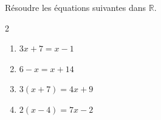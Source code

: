 \begin{exo}{}
	Résoudre les équations suivantes dans $\mathbb{R}$.

	\vspace*{-2mm}
	\begin{multicols}{2}
		\begin{enumerate}
			\item $3x + 7 = x - 1$
			\item $6 - x = x + 14$
			\item $3(x + 7) = 4x + 9$
			\item $2(x - 4) = 7x - 2$
		\end{enumerate}
	\end{multicols}
\end{exo}

